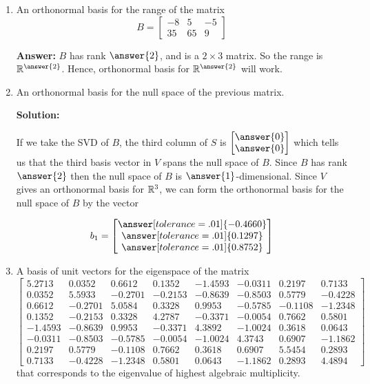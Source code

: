 \documentclass{ximera}
\begin{document}
\begin{example}
\begin{enumerate}
    
    \item An orthonormal basis for the range of the matrix \[
B = \begin{bmatrix} 
-8 & 5 & -5 \\ 
35 & 65 & 9 
\end{bmatrix}
\]

    \textbf{Answer:} $B$ has rank $\answer{2}$, and is a $2\times 3$ matrix. So the range is $\RR^{\answer{2}}$. Hence,  orthonormal basis for $\RR^{\answer{2}}$ will work.

    \item An orthonormal basis for the null space of the previous matrix.
    
    \textbf{Solution:}

    If we take the SVD of $B$, the third column of $S$ is $\begin{bmatrix}
        \answer{0}\\\answer{0}
    \end{bmatrix}$ which tells us that the third basis vector in $V$ spans the null space of $B$. Since $B$ has rank $\answer{2}$ then the null space of $B$ is $\answer{1}$-dimensional. Since $V$ gives an orthonormal basis for $\mathbb{R}^3$, we can form the orthonormal basis for the null space of $B$ by the vector

    $$b_1=\begin{bmatrix}
        \answer[tolerance=.01]{-0.4660} \\
        \answer[tolerance=.01]{0.1297} \\
        \answer[tolerance=.01]{0.8752}
        \end{bmatrix}$$
    
    \item A basis of unit vectors for the eigenspace of the matrix \[
\begin{bmatrix} 
5.2713 & 0.0352 & 0.6612 & 0.1352 & -1.4593 & -0.0311 & 0.2197 & 0.7133 \\ 
0.0352 & 5.5933 & -0.2701 & -0.2153 & -0.8639 & -0.8503 & 0.5779 & -0.4228 \\ 
0.6612 & -0.2701 & 5.0584 & 0.3328 & 0.9953 & -0.5785 & -0.1108 & -1.2348 \\ 
0.1352 & -0.2153 & 0.3328 & 4.2787 & -0.3371 & -0.0054 & 0.7662 & 0.5801 \\ 
-1.4593 & -0.8639 & 0.9953 & -0.3371 & 4.3892 & -1.0024 & 0.3618 & 0.0643 \\ 
-0.0311 & -0.8503 & -0.5785 & -0.0054 & -1.0024 & 4.3743 & 0.6907 & -1.1862 \\ 
0.2197 & 0.5779 & -0.1108 & 0.7662 & 0.3618 & 0.6907 & 5.5454 & 0.2893 \\ 
0.7133 & -0.4228 & -1.2348 & 0.5801 & 0.0643 & -1.1862 & 0.2893 & 4.4894 
\end{bmatrix}
\] that corresponds to the eigenvalue of highest algebraic multiplicity.


\end{enumerate}
\end{example}
\end{document}
